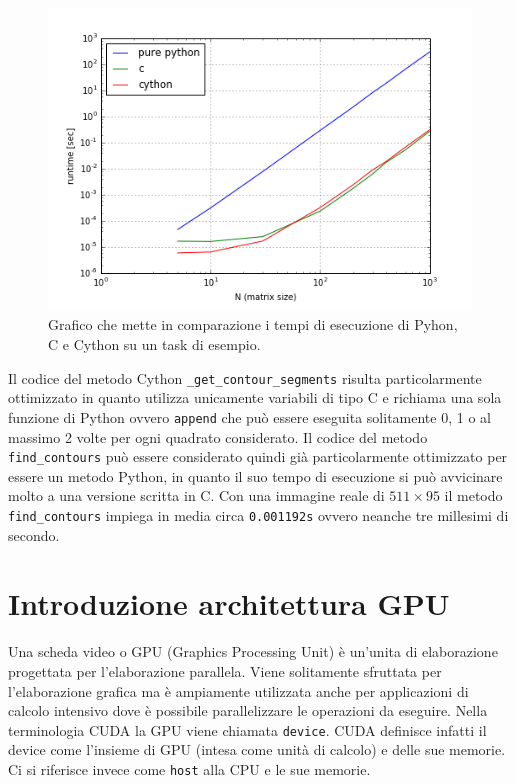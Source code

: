 \documentclass[12pt,a4paper]{report}
\begin{document}
\begin{figure}[H]
    \centering
    \includegraphics[scale=0.9]{img/cython-vs-c.png}
    \caption{Grafico che mette in comparazione i tempi di esecuzione di Pyhon, C e Cython su un task di esempio. 
}
\end{figure} 
Il codice del metodo Cython \verb|_get_contour_segments| risulta particolarmente ottimizzato in quanto utilizza unicamente variabili di tipo C e richiama una sola funzione di Python ovvero \verb|append| che può essere eseguita solitamente 0, 1 o al massimo 2 volte per ogni quadrato considerato. 
Il codice del metodo \verb|find_contours| può essere considerato quindi già particolarmente ottimizzato per essere un metodo Python, in quanto il suo tempo di esecuzione si può avvicinare molto a una versione scritta in C. \newline
Con una immagine reale di $511\times 95$ il metodo \verb|find_contours| impiega in media circa \verb|0.001192s| %
ovvero neanche tre millesimi di secondo.

\section{Introduzione architettura GPU}
Una scheda video o GPU (Graphics Processing Unit) è un'unita di elaborazione progettata per l'elaborazione parallela. Viene solitamente sfruttata per l'elaborazione grafica ma è ampiamente utilizzata anche per applicazioni di calcolo intensivo dove è possibile parallelizzare le operazioni da eseguire. \newline
Nella terminologia CUDA la GPU viene chiamata \verb|device|. CUDA definisce infatti il device come l'insieme di GPU (intesa come unità di calcolo) e delle sue memorie. Ci si riferisce invece come \verb|host| alla CPU e le sue memorie. \newline
\end{document}
